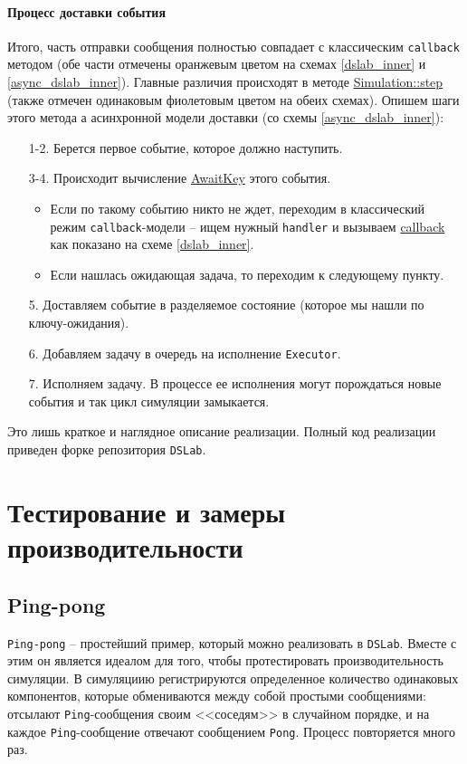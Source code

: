 \paragraph{Процесс доставки события} Итого, часть отправки сообщения полностью совпадает с классическим \texttt{callback} методом (обе части отмечены оранжевым цветом на схемах \ref{dslab_inner} и \ref{async_dslab_inner}). Главные различия происходят в методе \hyperref[Simulation::step]{Simulation::step} (также отмечен одинаковым фиолетовым цветом на обеих схемах). Опишем шаги этого метода а асинхронной модели доставки (со схемы \ref{async_dslab_inner}):
\begin{enumerate}
    \item[1-2.] Берется первое событие, которое должно наступить. 
    \item[3-4.] Происходит вычисление \hyperref[awaitkey]{AwaitKey} этого события.
    \begin{itemize} \item Если по такому событию никто не ждет, переходим в классический режим \texttt{callback}-модели -- ищем нужный \texttt{handler} и вызываем \hyperref[fnon]{callback} как показано на схеме \ref{dslab_inner}.
        \item Если нашлась ожидающая задача, то переходим к следующему пункту.
    \end{itemize}
    \item[5.] Доставляем событие в разделяемое состояние (которое мы нашли по ключу-ожидания).
    \item[6.] Добавляем задачу в очередь на исполнение \texttt{Executor}.
    \item[7.] Исполняем задачу. В процессе ее исполнения могут порождаться новые события и так цикл симуляции замыкается.  
\end{enumerate}

Это лишь краткое и наглядное описание реализации. Полный код реализации приведен форке репозитория \texttt{DSLab}\cite{async-dslab-core}. 
\section{Тестирование и замеры производительности} \label{async-testing}

\subsection{Ping-pong}

\texttt{Ping-pong} -- простейший пример, который можно реализовать в \texttt{DSLab}. Вместе с этим он является идеалом для того, чтобы протестировать производительность симуляции. В симуляциию регистрируются определенное количество одинаковых компонентов, которые обмениваются между собой простыми сообщениями: отсылают \texttt{Ping}-сообщения своим <<соседям>> в случайном порядке, и на каждое \texttt{Ping}-сообщение отвечают сообщением \texttt{Pong}. Процесс повторяется много раз.

